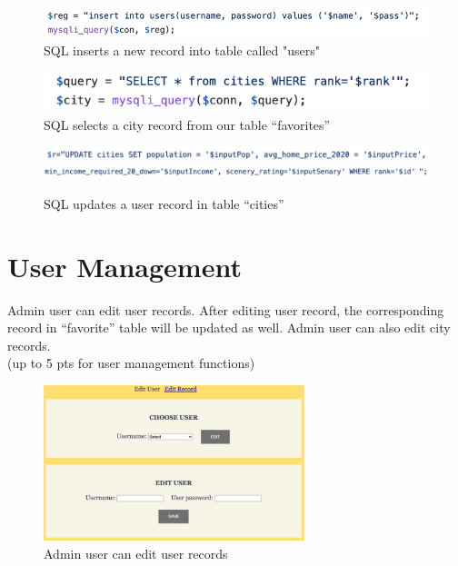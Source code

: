 \documentclass[12pt, letterpaper]{article}
\begin{document}
\begin{figure}[htbp]
	\centering
	\includegraphics[width=6in]{images/q16-1.png}
	\caption{SQL inserts a new record into table called "users" }
 \end{figure}
 
 \begin{figure}[htbp]
	\centering
	\includegraphics[width=6in]{images/q16-2.png}
	\caption{SQL selects a city record from our table “favorites” }
 \end{figure}
 
 \begin{figure}[htbp]
	\centering
	\includegraphics[width=6in]{images/q16-3.png}
	\includegraphics[width=6in]{images/q16-4.png}
	\caption{SQL updates a user record in table “cities” }
 \end{figure}

 \newpage

\section{User Management}
Admin user can edit user records. After editing user record, the corresponding record in “favorite” table will be updated as well.  Admin user can also edit city records.
\\(up to 5 pts for user management functions)

\begin{figure}[htbp]
	\centering
	\includegraphics[width=3in]{images/q17-1.png}
	\caption{Admin user can edit user records}
 \end{figure}
 
\end{document}
